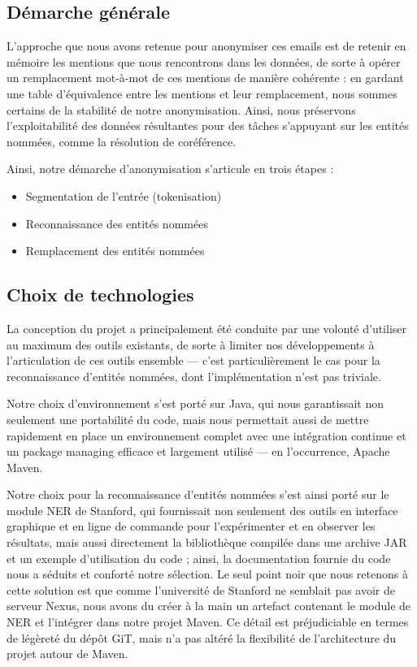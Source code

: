 \documentclass[11pt]{article}
\begin{document}
\subsection{Démarche générale}

L'approche que nous avons retenue pour anonymiser ces emails est de retenir en
mémoire les mentions que nous rencontrons dans les données, de sorte à opérer
un remplacement mot-à-mot de ces mentions de manière cohérente : en gardant
une table d'équivalence entre les mentions et leur remplacement, nous sommes
certains de la stabilité de notre anonymisation. Ainsi, nous préservons
l'exploitabilité des données résultantes pour des tâches s'appuyant sur les
entités nommées, comme la résolution de coréférence.

Ainsi, notre démarche d'anonymisation s'articule en trois étapes :

\begin{itemize}
\item Segmentation de l'entrée (tokenisation)
\item Reconnaissance des entités nommées
\item Remplacement des entités nommées
\end{itemize}

\subsection{Choix de technologies}

La conception du projet a principalement été conduite par une volonté d'utiliser
au maximum des outils existants, de sorte à limiter nos développements à 
l'articulation de ces outils ensemble --- c'est particulièrement le cas pour
la reconnaissance d'entités nommées, dont l'implémentation n'est pas triviale.

Notre choix d'environnement s'est porté sur Java, qui nous garantissait non
seulement une portabilité du code, mais nous permettait aussi de mettre
rapidement en place un environnement complet avec une intégration continue et
un package managing efficace et largement utilisé --- en l'occurrence, Apache
Maven.

Notre choix pour la reconnaissance d'entités nommées s'est ainsi porté sur
le module NER de Stanford, qui fournissait non seulement des outils en interface
graphique et en ligne de commande pour l'expérimenter et en observer les
résultats, mais aussi directement la bibliothèque compilée dans une archive JAR
et un exemple d'utilisation du code ; ainsi, la documentation fournie du code
nous a séduits et conforté notre sélection. Le seul point noir que nous retenons
à cette solution est que comme l'université de Stanford ne semblait pas avoir
de serveur Nexus, nous avons du créer à la main un artefact contenant le module
de NER et l'intégrer dans notre projet Maven. Ce détail est préjudiciable en
termes de légèreté du dépôt GiT, mais n'a pas altéré la flexibilité de 
l'architecture du projet autour de Maven.
\end{document}
